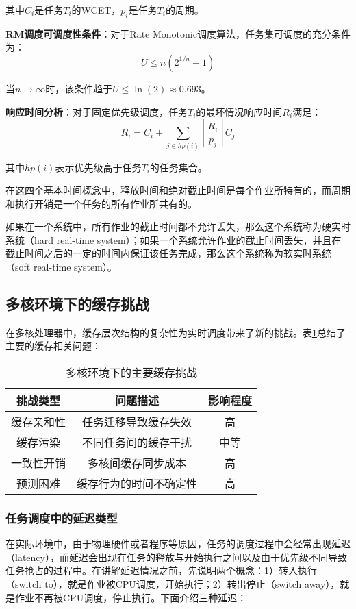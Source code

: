 其中$C_i$是任务$T_i$的WCET，$p_i$是任务$T_i$的周期。

\textbf{RM调度可调度性条件}：对于Rate Monotonic调度算法，任务集可调度的充分条件为：
$$U \leq n(2^{1/n} - 1)$$

当$n \to \infty$时，该条件趋于$U \leq \ln(2) \approx 0.693$。

\textbf{响应时间分析}：对于固定优先级调度，任务$T_i$的最坏情况响应时间$R_i$满足：
$$R_i = C_i + \sum_{j \in hp(i)} \left\lceil \frac{R_i}{p_j} \right\rceil C_j$$

其中$hp(i)$表示优先级高于任务$T_i$的任务集合。

在这四个基本时间概念中，释放时间和绝对截止时间是每个作业所特有的，而周期和执行开销是一个任务的所有作业所共有的。

如果在一个系统中，所有作业的截止时间都不允许丢失，那么这个系统称为硬实时系统（hard real-time system）；如果一个系统允许作业的截止时间丢失，并且在截止时间之后的一定的时间内保证该任务完成，那么这个系统称为软实时系统（soft real-time system）。

\subsection{多核环境下的缓存挑战}

在多核处理器中，缓存层次结构的复杂性为实时调度带来了新的挑战。\cite{r4_Cache-Aware_Partitioned_Scheduler_for_Hard_Real-Time}表\ref{tab:cache-challenges}总结了主要的缓存相关问题：

\begin{table}[H]
\centering
\begin{tabular}{ccc}
\toprule
挑战类型 & 问题描述 & 影响程度 \\
\midrule
缓存亲和性 & 任务迁移导致缓存失效 & 高 \\
\midrule
缓存污染 & 不同任务间的缓存干扰 & 中等 \\
\midrule
一致性开销 & 多核间缓存同步成本 & 高 \\
\midrule
预测困难 & 缓存行为的时间不确定性 & 高 \\
\bottomrule
\end{tabular}
\caption{多核环境下的主要缓存挑战}
\label{tab:cache-challenges}
\end{table}

\subsubsection{任务调度中的延迟类型}

在实际环境中，由于物理硬件或者程序等原因，任务的调度过程中会经常出现延迟（latency），而延迟会出现在任务的释放与开始执行之间以及由于优先级不同导致任务抢占的过程中。在讲解延迟情况之前，先说明两个概念：1）转入执行（switch to），就是作业被CPU调度，开始执行；2）转出停止（switch away），就是作业不再被CPU调度，停止执行。下面介绍三种延迟：

